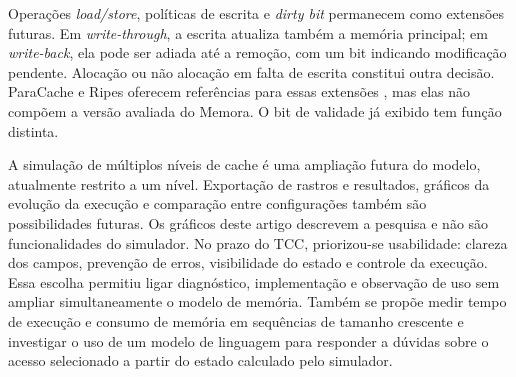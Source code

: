 \documentclass[article,12pt,oneside,a4paper,english,brazil]{abntex2}
\begin{document}
Operações \textit{load/store}, políticas de escrita e \textit{dirty bit} permanecem como extensões futuras. Em \textit{write-through}, a escrita atualiza também a memória principal; em \textit{write-back}, ela pode ser adiada até a remoção, com um bit indicando modificação pendente. Alocação ou não alocação em falta de escrita constitui outra decisão. ParaCache e Ripes oferecem referências para essas extensões \cite{paracacheweb2026,ripescache2026}, mas elas não compõem a versão avaliada do Memora. O bit de validade já exibido tem função distinta.

A simulação de múltiplos níveis de cache é uma ampliação futura do modelo, atualmente restrito a um nível. Exportação de rastros e resultados, gráficos da evolução da execução e comparação entre configurações também são possibilidades futuras. Os gráficos deste artigo descrevem a pesquisa e não são funcionalidades do simulador. No prazo do TCC, priorizou-se usabilidade: clareza dos campos, prevenção de erros, visibilidade do estado e controle da execução. Essa escolha permitiu ligar diagnóstico, implementação e observação de uso sem ampliar simultaneamente o modelo de memória. Também se propõe medir tempo de execução e consumo de memória em sequências de tamanho crescente e investigar o uso de um modelo de linguagem para responder a dúvidas sobre o acesso selecionado a partir do estado calculado pelo simulador.

\clearpage
\begingroup
{}
\setlength{\bibitemsep}{3pt}
\setlength{\parskip}{0pt}
\renewcommand{\biblistextra}{\setlength{\itemsep}{\bibitemsep}\setlength{\parsep}{0pt}\setlength{\parskip}{0pt}}
\renewcommand{\bibsection}{\section*{Referências}}

\endgroup


\clearpage
\appendix
\renewcommand{\thesection}{\Alph{section}}
\renewcommand*{\theHsection}{ap.\Alph{section}}
\newcommand{\apendicemanual}[2]{\clearpage\refstepcounter{section}\setcounter{figure}{0}\renewcommand{\thefigure}{\Alph{section}-\arabic{figure}}\renewcommand{\theHfigure}{ap.\Alph{section}.\arabic{figure}}\section*{Apêndice \Alph{section} --- #1}\label{#2}}
\newcommand{\anexomanual}[2]{\clearpage\refstepcounter{section}\setcounter{figure}{0}\renewcommand{\thefigure}{Anexo \Alph{section}-\arabic{figure}}\renewcommand{\theHfigure}{an.\Alph{section}.\arabic{figure}}\section*{Anexo \Alph{section} --- #1}\label{#2}}
\end{document}
